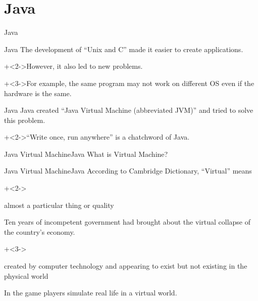 %
%

\section{Java}

\begin{frame}{}{}
    {\Huge Java}
\end{frame}


\begin{frame}{Java}{}
    The development of ``Unix and C'' made it easier to create applications.
    \vspace{4ex}

    \onslide+<2->{However, it also led to new problems.}
    \vspace{4ex}

    \onslide+<3->{For example, the same program may not work on different OS even if the hardware is the same.}
\end{frame}


\begin{frame}{Java}{}
    Java created ``Java Virtual Machine (abbreviated JVM)'' and tried to solve this problem.
    \vspace{4ex}

    \onslide+<2->{``Write once, run anywhere'' is a chatchword of Java.}
\end{frame}


\begin{frame}{Java Virtual Machine}{Java}
    What is Virtual Machine?
\end{frame}


\begin{frame}{Java Virtual Machine}{Java}
    According to Cambridge Dictionary, ``Virtual'' means
    \vspace{4ex}

    \begin{itemize}
        \onslide+<2->{\item almost a particular thing or quality

            {\footnotesize Ten years of incompetent government had brought about the virtual collapse of the country's economy.}}
        \onslide+<3->{\item created by computer technology and appearing to exist but not existing in the physical world

            {\footnotesize In the game players simulate real life in a virtual world.}}
    \end{itemize}
\end{frame}


